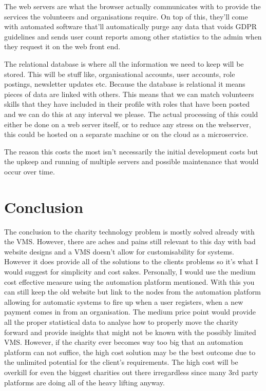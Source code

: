 \documentclass[11pt,a4paper]{article}
\begin{document}
\hfill \break

The web servers are what the browser actually communicates with to provide the services the volunteers and organisations require. On top of this, they'll come with automated software that'll automatically purge any data that voids GDPR guidelines and sends user count reports among other statistics to the admin when they request it on the web front end. 

\hfill \break

The relational database is where all the information we need to keep will be stored. This will be stuff like, organisational accounts, user accounts, role postings, newsletter updates etc. Because the database is relational it means pieces of data are linked with others. This means that we can match volunteers skills that they have included in their profile with roles that have been posted and we can do this at any interval we please. The actual processing of this could either be done on a web server itself, or to reduce any stress on the webserver, this could be hosted on a separate machine or on the cloud as a microservice. 

\hfill \break
The reason this costs the most isn't necessarily the initial development costs but the upkeep and running of multiple servers and possible maintenance that would occur over time.  


\section{Conclusion}

The conclusion to the charity technology problem is mostly solved already with the VMS. However, there are aches and pains still relevant to this day with bad website designs and a VMS doesn't allow for customisability for systems. However it does provide all of the solutions to the clients problems so it's what I would suggest for simplicity and cost sakes. Personally, I would use the medium cost effective measure using the automation platform mentioned. With this you can still keep the old website but link to the nodes from the automation platform allowing for automatic systems to fire up when a user registers, when a new payment comes in from an organisation. The medium price point would provide all the proper statistical data to analyse how to properly move the charity forward and provide insights that might not be known with the possibly limited VMS. However, if the charity ever becomes way too big that an automation platform can not suffice, the high cost solution may be the best outcome due to the unlimited potential for the client's requirements. The high cost will be overkill for even the biggest charities out there irregardless since many 3rd party platforms are doing all of the heavy lifting anyway.  
\end{document}
